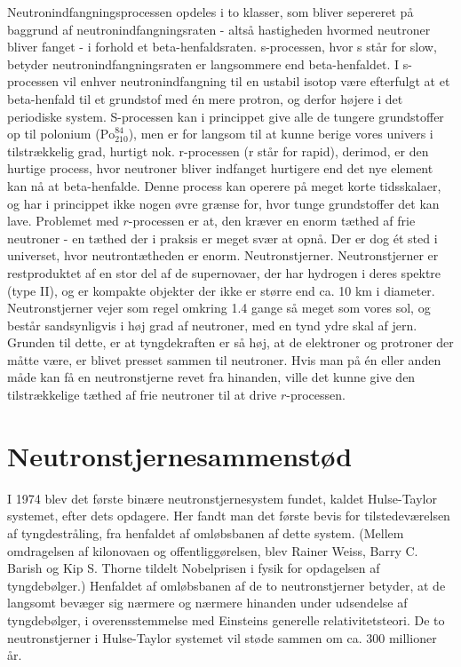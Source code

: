 \documentclass[twocolumn]{article}
\begin{document}
Neutronindfangningsprocessen opdeles i to klasser, som bliver sepereret på baggrund af neutronindfangningsraten - altså hastigheden hvormed neutroner bliver fanget - i forhold et beta-henfaldsraten. s-processen, hvor s står for slow, betyder neutronindfangningsraten er langsommere end beta-henfaldet. I s-processen vil enhver neutronindfangning til en ustabil isotop være efterfulgt at et beta-henfald til et grundstof med én mere protron, og derfor højere i det periodiske system. S-processen kan i princippet give alle de tungere grundstoffer op til polonium ($\mathrm{Po}_{210}^{84}$), men er for langsom til at kunne berige vores univers i tilstrækkelig grad, hurtigt nok. r-processen (r står for rapid), derimod, er den hurtige process, hvor neutroner bliver indfanget hurtigere end det nye element kan nå at beta-henfalde. Denne process kan operere på meget korte tidsskalaer, og har i princippet ikke nogen øvre grænse for, hvor tunge grundstoffer det kan lave. Problemet med $r$-processen er at, den kræver en enorm tæthed af frie neutroner - en tæthed der i praksis er meget svær at opnå. Der er dog ét sted i universet, hvor neutrontætheden er enorm. Neutronstjerner. Neutronstjerner er restproduktet af en stor del af de supernovaer, der har hydrogen i deres spektre (type II), og er kompakte objekter der ikke er større end ca. 10 km i diameter. Neutronstjerner vejer som regel omkring 1.4 gange så meget som vores sol, og består sandsynligvis i høj grad af neutroner, med en tynd ydre skal af jern. Grunden til dette, er at tyngdekraften er så høj, at de elektroner og protroner der måtte være, er blivet presset sammen til neutroner. Hvis man på én eller anden måde kan få en neutronstjerne revet fra hinanden, ville det kunne give den tilstrækkelige tæthed af frie neutroner til at drive $r$-processen.

\section{Neutronstjernesammenstød}\label{ns}


I 1974 blev det første binære neutronstjernesystem fundet, kaldet Hulse-Taylor systemet, efter dets opdagere. Her fandt man det første bevis for tilstedeværelsen af tyngdestråling, fra henfaldet af omløbsbanen af dette system. (Mellem omdragelsen af kilonovaen og offentliggørelsen, blev Rainer Weiss, Barry C. Barish og Kip S. Thorne tildelt Nobelprisen i fysik for opdagelsen af tyngdebølger.) Henfaldet af omløbsbanen af de to neutronstjerner betyder, at de langsomt bevæger sig nærmere og nærmere hinanden under udsendelse af tyngdebølger, i overensstemmelse med Einsteins generelle relativitetsteori. De to neutronstjerner i Hulse-Taylor systemet vil støde sammen om ca. 300 millioner år.  
\end{document}
